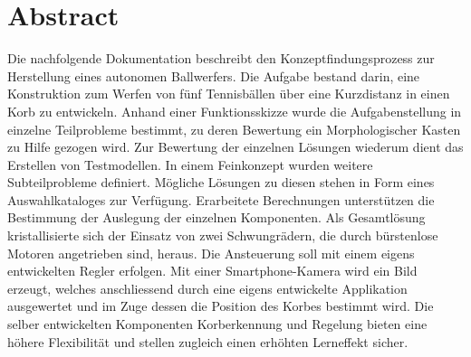 \section*{Abstract}
Die nachfolgende Dokumentation beschreibt den Konzeptfindungsprozess zur Herstellung eines autonomen Ballwerfers. Die Aufgabe bestand darin, eine Konstruktion zum Werfen von fünf Tennisbällen über eine Kurzdistanz in einen Korb zu entwickeln. Anhand einer Funktionsskizze wurde die Aufgabenstellung in einzelne Teilprobleme bestimmt, zu deren Bewertung ein Morphologischer Kasten zu Hilfe gezogen wird. Zur Bewertung der einzelnen Lösungen wiederum dient das Erstellen von Testmodellen. In einem Feinkonzept wurden weitere Subteilprobleme definiert. Mögliche Lösungen zu diesen stehen in Form eines Auswahlkataloges zur Verfügung. Erarbeitete Berechnungen unterstützen die Bestimmung der Auslegung der einzelnen Komponenten. Als Gesamtlösung kristallisierte sich der Einsatz von zwei Schwungrädern, die durch bürstenlose Motoren angetrieben sind, heraus. Die Ansteuerung soll mit einem eigens entwickelten Regler erfolgen. Mit einer Smartphone-Kamera wird ein Bild erzeugt, welches anschliessend durch eine eigens entwickelte Applikation ausgewertet und im Zuge dessen die Position des Korbes bestimmt wird. Die selber entwickelten Komponenten Korberkennung und Regelung bieten eine höhere Flexibilität und stellen zugleich einen erhöhten Lerneffekt sicher.
